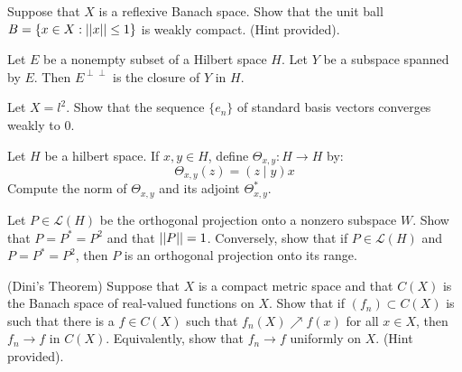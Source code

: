 \documentclass[12pt]{article}
\begin{document}


\begin{problem}{54}
    Suppose that $X$ is a reflexive Banach space. Show that the unit ball $B = \{x \in X: \left\vert\left\vert x\right\vert\right\vert \leq 1\}$ is weakly compact. (Hint provided). 

\end{problem}
\begin{solution}
\end{solution}
\newpage

\begin{problem}{59}
    Let $E$ be a nonempty subset of a Hilbert space $H$. Let $Y$ be a subspace spanned by $E$. Then $E^{\perp\perp}$ is the closure of $Y$ in $H$.
\end{problem}
\begin{solution}

\end{solution}
\newpage

\begin{problem}{60}
    Let $X = l^2$. Show that the sequence $\{e_n\}$ of standard basis vectors converges weakly to $0$. 
\end{problem}
\begin{solution}

\end{solution}
\newpage

\begin{problem}{61}
    Let $H$ be a hilbert space. If $x, y \in H$, define $\Theta_{x,y}: H \to H$ by:
    \[ \Theta_{x,y}(z) = (z \mid y)x\]
    Compute the norm of $\Theta_{x,y}$ and its adjoint $\Theta_{x,y}^*$.
\end{problem}
\begin{solution}

\end{solution}
\newpage

\begin{problem}{64}
    Let $P \in \mathcal{L}(H)$ be the orthogonal projection onto a nonzero subspace $W$. Show that $P = P^* = P^2$ and that $\left\vert\left\vert P\right\vert\right\vert = 1$. Conversely, show that if $P \in \mathcal{L}(H)$ and $P = P^* = P^2$, then $P$ is an orthogonal projection onto its range.
\end{problem}
\begin{solution}

\end{solution}
\newpage

\begin{problem}{65}(Dini's Theorem)
    Suppose that $X$ is a compact metric space and that $C(X)$ is the Banach space of real-valued functions on $X$. Show that if $(f_n) \subset C(X)$ is such that there is a $f \in C(X)$ such that $f_n(X) \nearrow f(x)$ for all $x \in X$, then $f_n \to f$ in $C(X)$. Equivalently, show that $f_n \to f$ uniformly on $X$. (Hint provided).
\end{problem}
\begin{solution}

\end{solution}
\newpage
\end{document}
